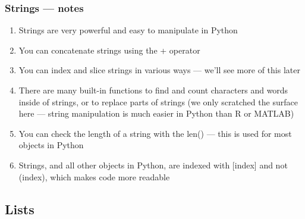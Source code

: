 \documentclass{beamer}\usepackage[]{graphicx}\usepackage[]{color}
\begin{document}
\begin{frame}
\frametitle{Strings --- notes}
	\begin{enumerate}
		\item Strings are very powerful and easy to manipulate in Python

		\item You can concatenate strings using the + operator

		\item You can index and slice strings in various ways --- we'll see more of this later

		\item There are many built-in functions to find and count characters and words inside of strings, or to replace parts of strings (we only scratched the surface here --- string manipulation is much easier in Python than R or MATLAB)

		\item You can check the length of a string with the len() --- this is used for most objects in Python
		\item Strings, and all other objects in Python, are indexed with [index] and not (index), which makes code more readable
	\end{enumerate}
\end{frame}

\subsection{Lists}
\end{document}
